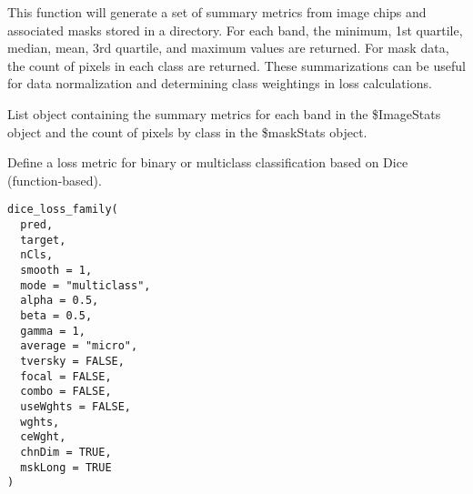 \documentclass[a4paper]{book}
\begin{document}
%
\begin{Details}\relax
This function will generate a set of summary metrics from image chips and
associated masks stored in a directory. For each band, the minimum, 1st
quartile, median, mean, 3rd quartile, and maximum values are returned. For
mask data, the count of pixels in each class are returned. These summarizations
can be useful for data normalization and determining class weightings in loss
calculations.
\end{Details}
%
\begin{Value}
List object containing the summary metrics for each band in the
\$ImageStats object and the count of pixels by class in the \$maskStats object.
\end{Value}
%
\begin{Description}\relax
Define a loss metric for binary or multiclass classification based on Dice (function-based).
\end{Description}
%
\begin{Usage}
\begin{verbatim}
dice_loss_family(
  pred,
  target,
  nCls,
  smooth = 1,
  mode = "multiclass",
  alpha = 0.5,
  beta = 0.5,
  gamma = 1,
  average = "micro",
  tversky = FALSE,
  focal = FALSE,
  combo = FALSE,
  useWghts = FALSE,
  wghts,
  ceWght,
  chnDim = TRUE,
  mskLong = TRUE
)
\end{verbatim}
\end{Usage}
%
\end{document}
